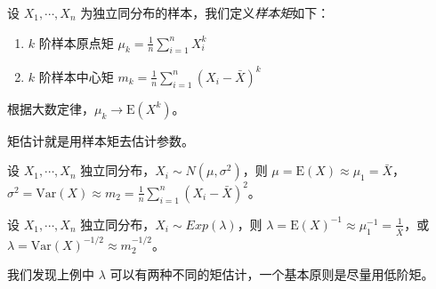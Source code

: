 \documentclass[../main.tex]{subfiles}
\begin{document}
设 $X_1,\cdots,X_n$ 为独立同分布的样本，我们定义\emph{样本矩}如下：
\begin{enumerate}
    \item $k$ 阶样本原点矩 $\mu_k=\frac1n\sum_{i=1}^nX_i^k$
    \item $k$ 阶样本中心矩 $m_k=\frac1n\sum_{i=1}^n(X_i-\bar X)^k$
\end{enumerate}

根据大数定律，$\mu_k\rightarrow\mathrm E(X^k)$。

矩估计就是用样本矩去估计参数。

\begin{example}
    设 $X_1,\cdots,X_n$ 独立同分布，$X_i\sim N(\mu,\sigma^2)$，则 $\mu=\mathrm E(X)\approx \mu_1=\bar X$，$\sigma^2=\mathrm{Var}(X)\approx m_2=\frac1n\sum_{i=1}^n(X_i-\bar X)^2$。
\end{example}

\begin{example}
    设 $X_1,\cdots,X_n$ 独立同分布，$X_i\sim Exp(\lambda)$，则 $\lambda=\mathrm E(X)^{-1}\approx \mu_1^{-1}=\frac1{\bar X}$，或 $\lambda=\mathrm{Var}(X)^{-1/2}\approx m_2^{-1/2}$。
\end{example}

我们发现上例中 $\lambda$ 可以有两种不同的矩估计，一个基本原则是尽量用低阶矩。


\end{document}
